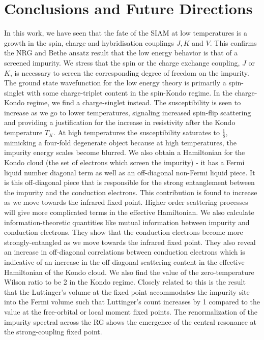\documentclass[12pt,twoside]{report}
\numberwithin{equation}{section}
\begin{document}
\chapter{Conclusions and Future Directions}
In this work, we have seen that the fate of the SIAM at low temperatures is a growth in the spin, charge and hybridisation couplings \(J,K\) and \(V\). This confirms the NRG and Bethe ansatz result that the low energy behavior is that of a screened impurity. We stress that the spin or the charge exchange coupling, \(J\) or \(K\), is necessary to screen the corresponding degree of freedom on the impurity. The ground state wavefunction for the low energy theory is primarily a spin-singlet with some charge-triplet content in  the spin-Kondo regime.  In the charge-Kondo regime, we find a charge-singlet instead. The susceptibility is seen to increase as we go to lower temperatures, signaling increased spin-flip scattering and providing a justification for the increase in resistivity after the Kondo temperature \(T_K\). At high temperatures the susceptibility saturates to \(\frac{1}{8}\), mimicking a four-fold degenerate object because at high temperatures, the impurity energy scales become blurred. 
\pb We also obtain a Hamiltonian for the Kondo cloud (the set of electrons which screen the impurity) - it has a Fermi liquid number diagonal term as well as an off-diagonal non-Fermi liquid piece. It is this off-diagonal piece that is responsible for the strong entanglement between the impurity and the conduction electrons. This contribution is found to increase as we move towards the infrared  fixed point. Higher order scattering processes will give more complicated terms in the effective Hamiltonian. We also calculate information-theoretic quantities like mutual information between impurity and conduction electrons. They show that the conduction electrons become more strongly-entangled as we move towards the infrared fixed point. They also reveal an increase in off-diagonal correlations between conduction electrons which is indicative of an increase in the off-diagonal scattering content in the effective Hamiltonian of the Kondo cloud. We also find the value of the zero-temperature Wilson ratio to be 2 in the Kondo regime. Closely related to this is the result that the Luttinger's volume at the fixed point accommodates the impurity site into the Fermi volume such that Luttinger's count increases by 1 compared to the value at the free-orbital or local moment fixed points. The renormalization of the impurity spectral across the RG shows the emergence of the central resonance at the strong-coupling fixed point.
\end{document}
